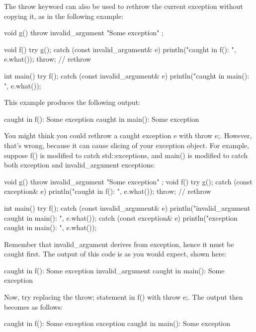 The throw keyword can also be used to rethrow the current exception without copying it, as in the following example:

\begin{cpp}
void g() { throw invalid_argument { "Some exception" }; }

void f()
{
    try {
        g();
    } catch (const invalid_argument& e) {
        println("caught in f(): {}", e.what());
        throw; // rethrow
    }
}

int main()
{
    try {
        f();
    } catch (const invalid_argument& e) {
        println("caught in main(): {}", e.what());
    }
}
\end{cpp}

This example produces the following output:

\begin{shell}
caught in f(): Some exception
caught in main(): Some exception
\end{shell}

You might think you could rethrow a caught exception e with throw e;. However, that’s wrong, because it can cause slicing of your exception object. For example, suppose f() is modified to catch std::exceptions, and main() is modified to catch both exception and invalid\_argument exceptions:

\begin{cpp}
void g() { throw invalid_argument { "Some exception" }; }
void f()
{
    try {
        g();
        } catch (const exception& e) {
        println("caught in f(): {}", e.what());
        throw; // rethrow
        }
    }

int main()
{
    try {
        f();
    } catch (const invalid_argument& e) {
        println("invalid_argument caught in main(): {}", e.what());
    } catch (const exception& e) {
        println("exception caught in main(): {}", e.what());
    }
}
\end{cpp}

Remember that invalid\_argument derives from exception, hence it must be caught first. The output of this code is as you would expect, shown here:

\begin{shell}
caught in f(): Some exception
invalid_argument caught in main(): Some exception
\end{shell}

Now, try replacing the throw; statement in f() with throw e;. The output then becomes as follows:

\begin{shell}
caught in f(): Some exception
exception caught in main(): Some exception
\end{shell}

